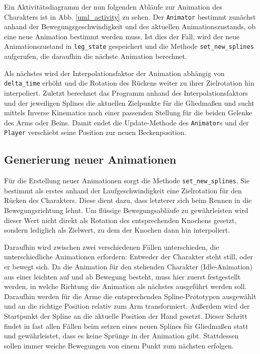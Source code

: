 Ein Aktivitätsdiagramm der nun folgenden Abläufe zur Animation des Charakters ist in Abb. \ref{uml_activity} zu sehen. Der \lstinline{Animator} bestimmt zunächst anhand der Bewegungsgeschwindigkeit und des aktuellen Animationszustands, ob eine neue Animation bestimmt werden muss. Ist dies der Fall, wird der neue Animationszustand in \lstinline{leg_state} gespeichert und die Methode \lstinline{set_new_splines} aufgerufen, die daraufhin die nächste Animation berechnet.

Als nächstes wird der Interpolationsfaktor der Animation abhängig von \lstinline{delta_time} erhöht und die Rotation des Rückens weiter zu ihrer Zielrotation hin interpoliert. Zuletzt berechnet das Programm anhand des Interpolationsfaktors und der jeweiligen Splines die aktuellen Zielpunkte für die Gliedmaßen und sucht mittels Inverse Kinematics nach einer passenden Stellung für die beiden Gelenke des Arms oder Beins. Damit endet die Update-Methode des \lstinline{Animator}s und der \lstinline{Player} verschiebt seine Position zur neuen Beckenposition.

\subsection{Generierung neuer Animationen}
Für die Erstellung neuer Animationen sorgt die Methode \lstinline{set_new_splines}. Sie bestimmt als erstes anhand der Laufgeschwindigkeit eine Zielrotation für den Rücken des Charakters. Diese dient dazu, dass letzterer sich beim Rennen in die Bewegungsrichtung lehnt. Um flüssige Bewegungsabläufe zu gewährleisten wird dieser Wert nicht direkt als Rotation des entsprechenden Knochens gesetzt, sondern lediglich als Zielwert, zu dem der Knochen dann hin interpoliert.

Daraufhin wird zwischen zwei verschiedenen Fällen unterschieden, die unterschiedliche Animationen erfordern: Entweder der Charakter steht still, oder er bewegt sich. Da die Animation für den stehenden Charakter (Idle-Animation) aus einer leichten auf und ab Bewegung besteht, muss hier zuerst festgestellt werden, in welche Richtung die Animation als nächstes ausgeführt werden soll. Daraufhin werden für die Arme die entsprechenden Spline-Prototypen ausgewählt und an die richtige Position relativ zum Arm transformiert. Außerdem wird der Startpunkt der Spline an die aktuelle Position der Hand gesetzt. Dieser Schritt findet in fast allen Fällen beim setzen eines neuen Splines für Gliedmaßen statt und gewährleistet, dass es keine Sprünge in der Animation gibt. Stattdessen sollen immer weiche Bewegungen von einem Punkt zum nächsten erfolgen.

